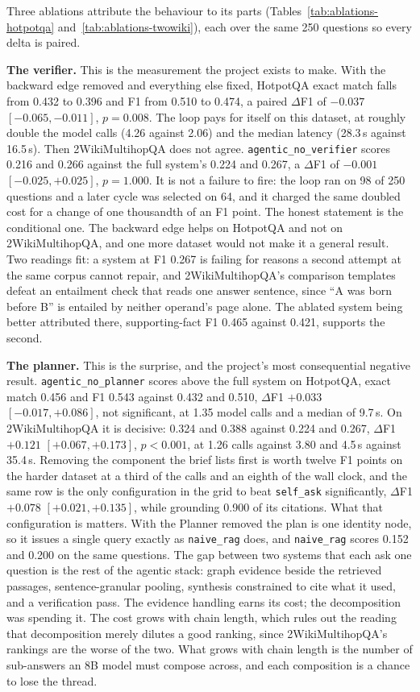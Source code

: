 Three ablations attribute the behaviour to its parts
(Tables~\ref{tab:ablations-hotpotqa} and~\ref{tab:ablations-twowiki}), each
over the same 250 questions so every delta is paired.

\textbf{The verifier.} This is the measurement the project exists to make.
With the backward edge removed and everything else fixed, HotpotQA exact match
falls from 0.432 to 0.396 and F1 from 0.510 to 0.474, a paired $\Delta$F1 of
$-0.037$ $[-0.065, -0.011]$, $p = 0.008$. The loop pays for itself on this
dataset, at roughly double the model calls (4.26 against 2.06) and the median
latency (28.3\,s against 16.5\,s). Then 2WikiMultihopQA does not agree.
\texttt{agentic\_no\_verifier} scores 0.216 and 0.266 against the full
system's 0.224 and 0.267, a $\Delta$F1 of $-0.001$ $[-0.025, +0.025]$,
$p = 1.000$. It is not a failure to fire: the loop ran on 98 of 250 questions
and a later cycle was selected on 64, and it charged the same doubled cost for
a change of one thousandth of an F1 point. The honest statement is the
conditional one. The backward edge helps on HotpotQA and not on
2WikiMultihopQA, and one more dataset would not make it a general result. Two
readings fit: a system at F1 0.267 is failing for reasons a second attempt at
the same corpus cannot repair, and 2WikiMultihopQA's comparison templates
defeat an entailment check that reads one answer sentence, since ``A was born
before B'' is entailed by neither operand's page alone. The ablated system
being better attributed there, supporting-fact F1 0.465 against 0.421,
supports the second.

\textbf{The planner.} This is the surprise, and the project's most
consequential negative result. \texttt{agentic\_no\_planner} scores above the
full system on HotpotQA, exact match 0.456 and F1 0.543 against 0.432 and
0.510, $\Delta$F1 $+0.033$ $[-0.017, +0.086]$, not significant, at 1.35 model
calls and a median of 9.7\,s. On 2WikiMultihopQA it is decisive: 0.324 and
0.388 against 0.224 and 0.267, $\Delta$F1 $+0.121$ $[+0.067, +0.173]$,
$p < 0.001$, at 1.26 calls against 3.80 and 4.5\,s against 35.4\,s. Removing
the component the brief lists first is worth twelve F1 points on the harder
dataset at a third of the calls and an eighth of the wall clock, and the same
row is the only configuration in the grid to beat \texttt{self\_ask}
significantly, $\Delta$F1 $+0.078$ $[+0.021, +0.135]$, while grounding 0.900
of its citations. What that configuration is matters. With the Planner removed
the plan is one identity node, so it issues a single query exactly as
\texttt{naive\_rag} does, and \texttt{naive\_rag} scores 0.152 and 0.200 on
the same questions. The gap between two systems that each ask one question is
the rest of the agentic stack: graph evidence beside the retrieved passages,
sentence-granular pooling, synthesis constrained to cite what it used, and a
verification pass. The evidence handling earns its cost; the decomposition was
spending it. The cost grows with chain length, which rules out the reading
that decomposition merely dilutes a good ranking, since 2WikiMultihopQA's
rankings are the worse of the two. What grows with chain length is the number
of sub-answers an 8B model must compose across, and each composition is a
chance to lose the thread.


